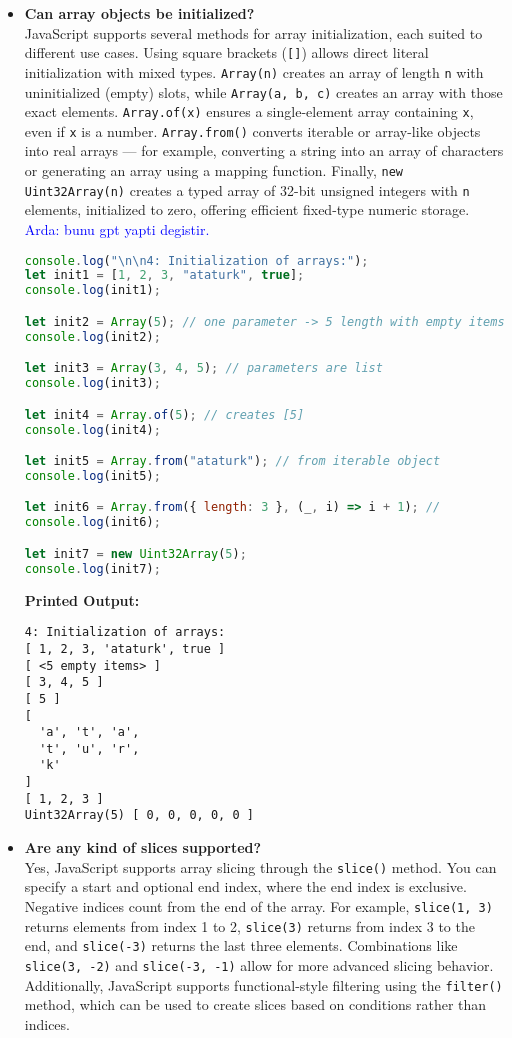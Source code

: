 \documentclass{article}
\newcommand{\arda}[1]{\textcolor{blue}{Arda: #1}}
\begin{document}
\begin{itemize}
\item \textbf{Can array objects be initialized?} \\
JavaScript supports several methods for array initialization, each suited to different use cases. Using square brackets (\texttt{[]}) allows direct literal initialization with mixed types. \texttt{Array(n)} creates an array of length \texttt{n} with uninitialized (empty) slots, while \texttt{Array(a, b, c)} creates an array with those exact elements. \texttt{Array.of(x)} ensures a single-element array containing \texttt{x}, even if \texttt{x} is a number. \texttt{Array.from()} converts iterable or array-like objects into real arrays — for example, converting a string into an array of characters or generating an array using a mapping function. Finally, \texttt{new Uint32Array(n)} creates a typed array of 32-bit unsigned integers with \texttt{n} elements, initialized to zero, offering efficient fixed-type numeric storage.
\arda{bunu gpt yapti degistir.}
\begin{lstlisting}[language=JavaScript]
console.log("\n\n4: Initialization of arrays:");
let init1 = [1, 2, 3, "ataturk", true];
console.log(init1);

let init2 = Array(5); // one parameter -> 5 length with empty items.
console.log(init2);

let init3 = Array(3, 4, 5); // parameters are list 
console.log(init3);

let init4 = Array.of(5); // creates [5]
console.log(init4);

let init5 = Array.from("ataturk"); // from iterable object
console.log(init5);

let init6 = Array.from({ length: 3 }, (_, i) => i + 1); // 
console.log(init6);

let init7 = new Uint32Array(5);
console.log(init7);
\end{lstlisting}
\textbf{Printed Output:}
\begin{verbatim}
4: Initialization of arrays:
[ 1, 2, 3, 'ataturk', true ]
[ <5 empty items> ]
[ 3, 4, 5 ]
[ 5 ]
[
  'a', 't', 'a',
  't', 'u', 'r',
  'k'
]
[ 1, 2, 3 ]
Uint32Array(5) [ 0, 0, 0, 0, 0 ]
\end{verbatim}


\item \textbf{Are any kind of slices supported?} \\
Yes, JavaScript supports array slicing through the \texttt{slice()} method. You can specify a start and optional end index, where the end index is exclusive. Negative indices count from the end of the array. For example, \texttt{slice(1, 3)} returns elements from index 1 to 2, \texttt{slice(3)} returns from index 3 to the end, and \texttt{slice(-3)} returns the last three elements. Combinations like \texttt{slice(3, -2)} and \texttt{slice(-3, -1)} allow for more advanced slicing behavior. Additionally, JavaScript supports functional-style filtering using the \texttt{filter()} method, which can be used to create slices based on conditions rather than indices.


\end{itemize}
\end{document}
